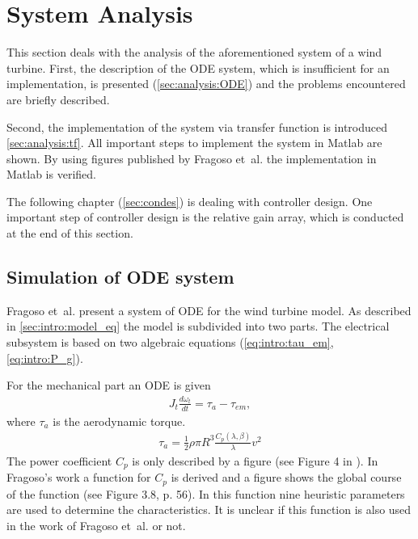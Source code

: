 
\section{System Analysis} \label{sec:analysis}

This section deals with the analysis of the aforementioned system of a wind turbine.
First, the description of the ODE system, which is insufficient for an implementation, is presented (\autoref{sec:analysis:ODE}) and the problems encountered are briefly described.

Second, the implementation of the system via transfer function is introduced \autoref{sec:analysis:tf}.
All important steps to implement the system in Matlab are shown.
By using figures published by Fragoso et~al. \cite{Fragoso_et_al_2017} the implementation in Matlab is verified.

The following chapter (\autoref{sec:condes}) is dealing with controller design.
One important step of controller design is the relative gain array, which is conducted at the end of this section.

\subsection{Simulation of ODE system} \label{sec:analysis:ODE}

Fragoso et~al. \cite{Fragoso_et_al_2017} present a system of ODE for the wind turbine model.
As described in \autoref{sec:intro:model_eq} the model is subdivided into two parts.
The electrical subsystem is based on two algebraic equations (\autoref{eq:intro:tau_em}, \autoref{eq:intro:P_g}).

For the mechanical part an ODE is given
\begin{align}
    J_t \frac{d \omega_t}{dt} = \tau_a - \tau_{em}, \label{eq:analysis:ODE_mechanical}
\end{align}
where $\tau_a$ is the aerodynamic torque.
\begin{align}
    \tau_a = \frac{1}{2} \rho \pi R^3 \frac{C_p\left( \lambda, \beta\right)}{\lambda} v^2
\end{align}
The power coefficient $C_p$ is only described by a figure (see Figure 4 in \cite{Fragoso_et_al_2017}).
In Fragoso's work \cite[p. 54 ff.]{Fragoso_PhD_2016} a function for $C_p$ is derived and a figure shows the global course of the function (see Figure 3.8, p. 56).
In this function nine heuristic parameters are used to determine the characteristics.
It is unclear if this function is also used in the work of Fragoso et~al. or not.

